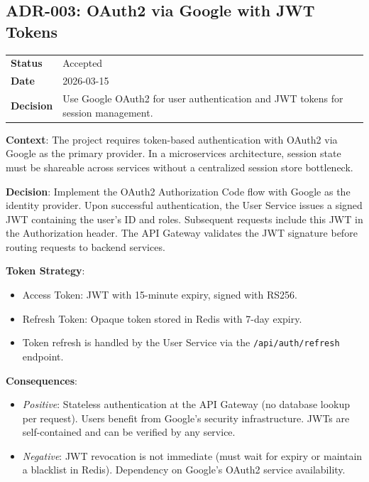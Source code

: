 \subsection{ADR-003: OAuth2 via Google with JWT Tokens}

\begin{tabular}{p{3cm}p{10cm}}
\textbf{Status} & Accepted \\
\textbf{Date} & 2026-03-15 \\
\textbf{Decision} & Use Google OAuth2 for user authentication and JWT tokens for session management. \\
\end{tabular}

\textbf{Context}: The project requires token-based authentication with OAuth2 via Google as the primary provider. In a microservices architecture, session state must be shareable across services without a centralized session store bottleneck.

\textbf{Decision}: Implement the OAuth2 Authorization Code flow with Google as the identity provider. Upon successful authentication, the User Service issues a signed JWT containing the user's ID and roles. Subsequent requests include this JWT in the Authorization header. The API Gateway validates the JWT signature before routing requests to backend services.

\textbf{Token Strategy}:
\begin{itemize}
    \item Access Token: JWT with 15-minute expiry, signed with RS256.
    \item Refresh Token: Opaque token stored in Redis with 7-day expiry.
    \item Token refresh is handled by the User Service via the \texttt{/api/auth/refresh} endpoint.
\end{itemize}

\textbf{Consequences}:
\begin{itemize}
    \item \textit{Positive}: Stateless authentication at the API Gateway (no database lookup per request). Users benefit from Google's security infrastructure. JWTs are self-contained and can be verified by any service.
    \item \textit{Negative}: JWT revocation is not immediate (must wait for expiry or maintain a blacklist in Redis). Dependency on Google's OAuth2 service availability.
\end{itemize}
